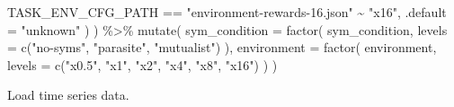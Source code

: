 \documentclass[
]{book}
\newenvironment{Shaded}{\begin{snugshade}}{\end{snugshade}}
\newcommand{\AttributeTok}[1]{\textcolor[rgb]{0.77,0.63,0.00}{#1}}
\newcommand{\FunctionTok}[1]{\textcolor[rgb]{0.00,0.00,0.00}{#1}}
\newcommand{\NormalTok}[1]{#1}
\newcommand{\SpecialCharTok}[1]{\textcolor[rgb]{0.00,0.00,0.00}{#1}}
\newcommand{\StringTok}[1]{\textcolor[rgb]{0.31,0.60,0.02}{#1}}
\begin{document}
\begin{Shaded}
\begin{Highlighting}[]
\NormalTok{      TASK\_ENV\_CFG\_PATH }\SpecialCharTok{==} \StringTok{"environment{-}rewards{-}16.json"} \SpecialCharTok{\textasciitilde{}} \StringTok{"x16"}\NormalTok{,}
      \AttributeTok{.default =} \StringTok{"unknown"}
\NormalTok{    )}
\NormalTok{  ) }\SpecialCharTok{\%\textgreater{}\%}
  \FunctionTok{mutate}\NormalTok{(}
    \AttributeTok{sym\_condition =} \FunctionTok{factor}\NormalTok{(}
\NormalTok{      sym\_condition,}
      \AttributeTok{levels =} \FunctionTok{c}\NormalTok{(}\StringTok{"no{-}syms"}\NormalTok{, }\StringTok{"parasite"}\NormalTok{, }\StringTok{"mutualist"}\NormalTok{)}
\NormalTok{    ),}
    \AttributeTok{environment =} \FunctionTok{factor}\NormalTok{(}
\NormalTok{      environment,}
      \AttributeTok{levels =} \FunctionTok{c}\NormalTok{(}\StringTok{"x0.5"}\NormalTok{, }\StringTok{"x1"}\NormalTok{, }\StringTok{"x2"}\NormalTok{, }\StringTok{"x4"}\NormalTok{, }\StringTok{"x8"}\NormalTok{, }\StringTok{"x16"}\NormalTok{)}
\NormalTok{    )}
\NormalTok{  )}
\end{Highlighting}
\end{Shaded}

Load time series data.
\end{document}
